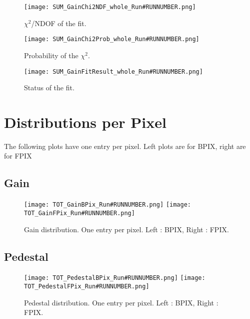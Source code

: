 \documentclass[a4paper,10pt]{article}
\begin{document}
\begin{figure}[htp]
 \centering
  \texttt{[image: SUM\_GainChi2NDF\_whole\_Run\#RUNNUMBER.png]}
\caption{$\chi^2$/NDOF of the fit.}
\end{figure}


\begin{figure}[htp]
 \centering
  \texttt{[image: SUM\_GainChi2Prob\_whole\_Run\#RUNNUMBER.png]}
\caption{Probability of the $\chi^2$.}
\end{figure}

\begin{figure}[htp]
 \centering
  \texttt{[image: SUM\_GainFitResult\_whole\_Run\#RUNNUMBER.png]}
\caption{Status of the fit.}
\end{figure}

\pagebreak
\clearpage














\section{Distributions per Pixel\label{sec:pixel}}

The following plots have one entry per pixel. Left plots are for BPIX, right are for FPIX

\subsection{Gain}

\begin{figure}[htp]
 \centering
\subfigure
 {\texttt{[image: TOT\_GainBPix\_Run\#RUNNUMBER.png]}}
\subfigure
 {\texttt{[image: TOT\_GainFPix\_Run\#RUNNUMBER.png]}}
\caption{Gain distribution. One entry per pixel. Left : BPIX, Right : FPIX.}
\end{figure}



\subsection{Pedestal}

\begin{figure}[htp]
 \centering
\subfigure
 {\texttt{[image: TOT\_PedestalBPix\_Run\#RUNNUMBER.png]}}
\subfigure
 {\texttt{[image: TOT\_PedestalFPix\_Run\#RUNNUMBER.png]}}
\caption{Pedestal distribution. One entry per pixel. Left : BPIX, Right : FPIX.}
\end{figure}
\clearpage
\end{document}
